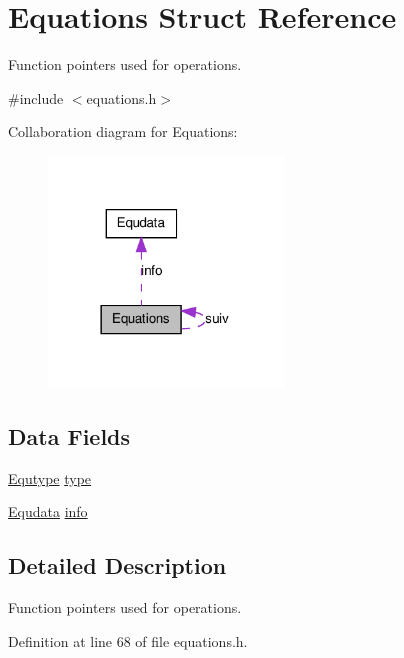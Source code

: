\hypertarget{structEquations}{
\section{Equations Struct Reference}
\label{structEquations}
}


Function pointers used for operations.  




{\ttfamily \#include $<$equations.h$>$}



Collaboration diagram for Equations:\nopagebreak
\begin{figure}[H]
\begin{center}
\leavevmode
\includegraphics[width=177pt]{structEquations__coll__graph}
\end{center}
\end{figure}
\subsection*{Data Fields}
\begin{DoxyCompactItemize}
\item 
\hyperlink{equations_8h_adbcf1047b90fcdb0f3d285fb4a7c70d0}{Equtype} \hyperlink{structEquations_add825d3104abf54c01421c67536d0991}{type}
\item 
\hyperlink{unionEqudata}{Equdata} \hyperlink{structEquations_a144a9d4f5c2af07da3ecdebbeb419d66}{info}
\end{DoxyCompactItemize}


\subsection{Detailed Description}
Function pointers used for operations. 

Definition at line 68 of file equations.h.



